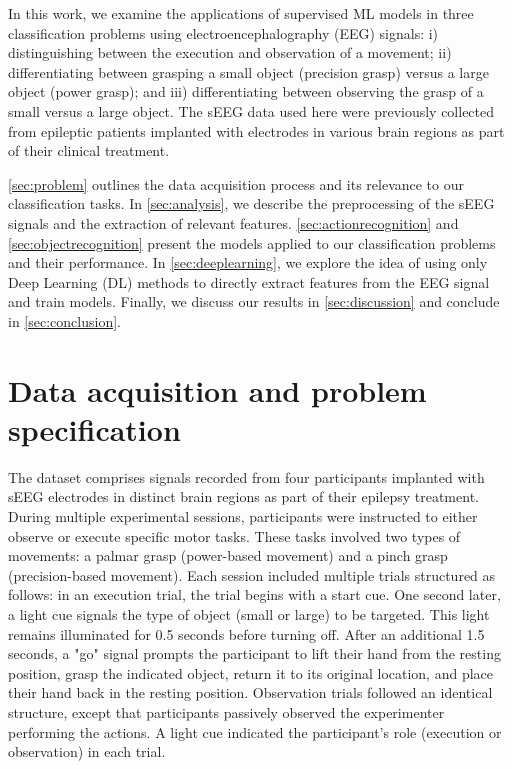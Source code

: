 \documentclass[10pt,conference,compsocconf]{IEEEtran}
\begin{document}
In this work, we examine the applications of supervised ML models in three classification problems using electroencephalography (EEG) signals: i) distinguishing between the execution and observation of a movement; ii) differentiating between grasping a small object (precision grasp) versus a large object (power grasp); and iii) differentiating between observing the grasp of a small versus a large object. The sEEG data used here were previously collected from epileptic patients implanted with electrodes in various brain regions as part of their clinical treatment.

\autoref{sec:problem} outlines the data acquisition process and its relevance to our classification tasks. In \autoref{sec:analysis}, we describe the preprocessing of the sEEG signals and the extraction of relevant features. \autoref{sec:actionrecognition} and \autoref{sec:objectrecognition} present the models applied to our classification problems and their performance. In \autoref{sec:deeplearning}, we explore the idea of using only Deep Learning (DL) methods to directly extract features from the EEG signal and train models. Finally, we discuss our results in \autoref{sec:discussion} and conclude in \autoref{sec:conclusion}.

\section{Data acquisition and problem specification}
\label{sec:problem}
The dataset comprises signals recorded from four participants implanted with sEEG electrodes in distinct brain regions as part of their epilepsy treatment. During multiple experimental sessions, participants were instructed to either observe or execute specific motor tasks. These tasks involved two types of movements: a palmar grasp (power-based movement) and a pinch grasp (precision-based movement). Each session included multiple trials structured as follows: in an execution trial, the trial begins with a start cue. One second later, a light cue signals the type of object (small or large) to be targeted. This light remains illuminated for 0.5 seconds before turning off. After an additional 1.5 seconds, a "go" signal prompts the participant to lift their hand from the resting position, grasp the indicated object, return it to its original location, and place their hand back in the resting position. Observation trials followed an identical structure, except that participants passively observed the experimenter performing the actions. A light cue indicated the participant's role (execution or observation) in each trial.
\end{document}
